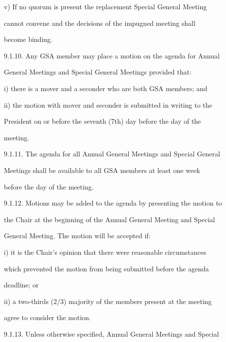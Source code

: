 v)      If  no  quorum  is  present  the  replacement  Special  General  Meeting  

        cannot  convene  and  the  decisions  of  the  impugned  meeting  shall  

        become binding.  



9.1.10.     Any GSA member may place a motion on the agenda for Annual  

        General Meetings and Special General Meetings provided that:  



i)      there is a mover and a seconder who are both GSA members; and  



ii)     the  motion  with  mover  and  seconder  is  submitted  in  writing  to  the  

        President  on  or  before  the  seventh  (7th)  day  before  the  day  of  the  

        meeting.  



9.1.11.     The agenda for all Annual General Meetings and Special General  

        Meetings  shall  be  available  to  all  GSA  members  at  least  one  week  

        before the day of the meeting.  



9.1.12.     Motions may be added to the agenda by  presenting the motion to  

        the Chair at the beginning of the Annual General Meeting and Special  

        General Meeting. The motion will be accepted if:  



i)      it  is  the  Chair's  opinion  that  there  were  reasonable  circumstances  

        which prevented the motion  from  being  submitted before  the agenda  

        deadline; or  



ii)     a  two-thirds  (2/3)  majority  of  the  members  present  at  the  meeting  

        agree to consider the motion.  



9.1.13.     Unless otherwise specified, Annual General Meetings and Special  

